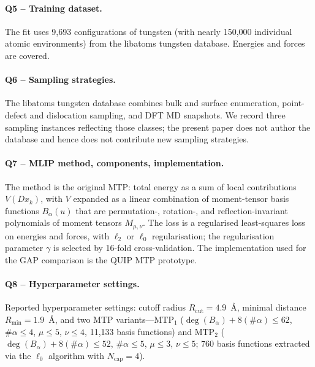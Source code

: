 \paragraph{Q5 -- Training dataset.}
The fit uses 9{,}693 configurations of tungsten (with nearly
150{,}000 individual atomic environments) from the libatoms
tungsten database. Energies and forces are covered.


\paragraph{Q6 -- Sampling strategies.}
The libatoms tungsten database combines bulk and surface
enumeration, point-defect and dislocation sampling, and
DFT MD snapshots. We record three sampling instances reflecting
those classes; the present paper does not author the database
and hence does not contribute new sampling strategies.


\paragraph{Q7 -- MLIP method, components, implementation.}
The method is the original MTP: total energy as a sum of local
contributions $V(Dx_k)$, with $V$ expanded as a linear
combination of moment-tensor basis functions $B_\alpha(u)$ that
are permutation-, rotation-, and reflection-invariant
polynomials of moment tensors $M_{\mu,\nu}$. The loss is a
regularised least-squares loss on energies and forces, with
$\ell_2$ or $\ell_0$ regularisation; the regularisation parameter
$\gamma$ is selected by 16-fold cross-validation. The
implementation used for the GAP comparison is the QUIP MTP
prototype.


\paragraph{Q8 -- Hyperparameter settings.}
Reported hyperparameter settings: cutoff radius
$R_{\mathrm{cut}} = 4.9$~\AA, minimal distance
$R_{\min} = 1.9$~\AA, and two MTP variants---MTP$_1$
($\deg(B_\alpha) + 8(\#\alpha) \leq 62$, $\#\alpha \leq 4$,
$\mu \leq 5$, $\nu \leq 4$, 11{,}133 basis functions) and
MTP$_2$ ($\deg(B_\alpha) + 8(\#\alpha) \leq 52$, $\#\alpha \leq 5$,
$\mu \leq 3$, $\nu \leq 5$; 760 basis functions extracted via
the $\ell_0$ algorithm with $N_{\mathrm{cap}} = 4$).


